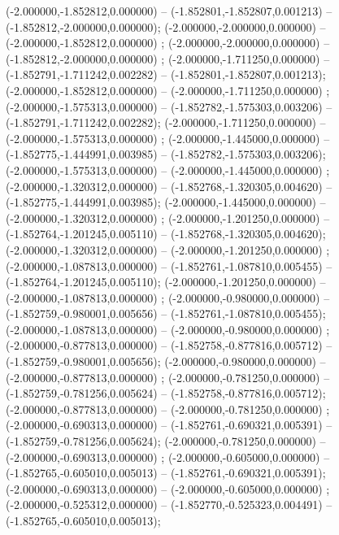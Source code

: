  (-2.000000,-1.852812,0.000000) -- (-1.852801,-1.852807,0.001213) -- (-1.852812,-2.000000,0.000000);
 (-2.000000,-2.000000,0.000000) -- (-2.000000,-1.852812,0.000000) ;
 (-2.000000,-2.000000,0.000000) -- (-1.852812,-2.000000,0.000000) ;
 (-2.000000,-1.711250,0.000000) -- (-1.852791,-1.711242,0.002282) -- (-1.852801,-1.852807,0.001213);
 (-2.000000,-1.852812,0.000000) -- (-2.000000,-1.711250,0.000000) ;
 (-2.000000,-1.575313,0.000000) -- (-1.852782,-1.575303,0.003206) -- (-1.852791,-1.711242,0.002282);
 (-2.000000,-1.711250,0.000000) -- (-2.000000,-1.575313,0.000000) ;
 (-2.000000,-1.445000,0.000000) -- (-1.852775,-1.444991,0.003985) -- (-1.852782,-1.575303,0.003206);
 (-2.000000,-1.575313,0.000000) -- (-2.000000,-1.445000,0.000000) ;
 (-2.000000,-1.320312,0.000000) -- (-1.852768,-1.320305,0.004620) -- (-1.852775,-1.444991,0.003985);
 (-2.000000,-1.445000,0.000000) -- (-2.000000,-1.320312,0.000000) ;
 (-2.000000,-1.201250,0.000000) -- (-1.852764,-1.201245,0.005110) -- (-1.852768,-1.320305,0.004620);
 (-2.000000,-1.320312,0.000000) -- (-2.000000,-1.201250,0.000000) ;
 (-2.000000,-1.087813,0.000000) -- (-1.852761,-1.087810,0.005455) -- (-1.852764,-1.201245,0.005110);
 (-2.000000,-1.201250,0.000000) -- (-2.000000,-1.087813,0.000000) ;
 (-2.000000,-0.980000,0.000000) -- (-1.852759,-0.980001,0.005656) -- (-1.852761,-1.087810,0.005455);
 (-2.000000,-1.087813,0.000000) -- (-2.000000,-0.980000,0.000000) ;
 (-2.000000,-0.877813,0.000000) -- (-1.852758,-0.877816,0.005712) -- (-1.852759,-0.980001,0.005656);
 (-2.000000,-0.980000,0.000000) -- (-2.000000,-0.877813,0.000000) ;
 (-2.000000,-0.781250,0.000000) -- (-1.852759,-0.781256,0.005624) -- (-1.852758,-0.877816,0.005712);
 (-2.000000,-0.877813,0.000000) -- (-2.000000,-0.781250,0.000000) ;
 (-2.000000,-0.690313,0.000000) -- (-1.852761,-0.690321,0.005391) -- (-1.852759,-0.781256,0.005624);
 (-2.000000,-0.781250,0.000000) -- (-2.000000,-0.690313,0.000000) ;
 (-2.000000,-0.605000,0.000000) -- (-1.852765,-0.605010,0.005013) -- (-1.852761,-0.690321,0.005391);
 (-2.000000,-0.690313,0.000000) -- (-2.000000,-0.605000,0.000000) ;
 (-2.000000,-0.525312,0.000000) -- (-1.852770,-0.525323,0.004491) -- (-1.852765,-0.605010,0.005013);
